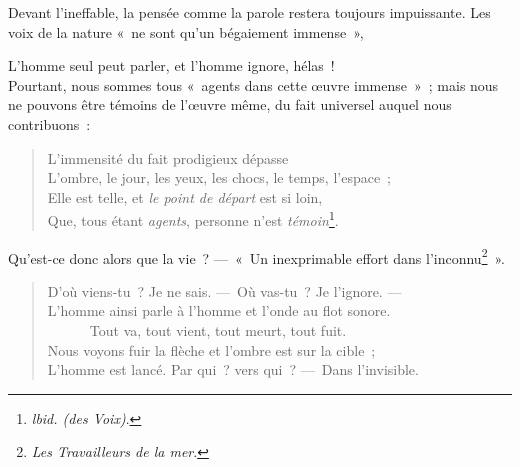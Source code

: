 \documentclass[french,twoside]{book} %
\begin{document}
\noindent Devant l’ineffable, la pensée comme la parole restera toujours impuissante. Les voix de la nature « ne sont qu’un bégaiement immense »,\par

L’homme seul peut parler, et l’homme ignore, hélas !\\

\noindent Pourtant, nous sommes tous « agents dans cette œuvre immense » ; mais nous ne pouvons être témoins de l’œuvre même, du fait universel auquel nous contribuons :\par


\begin{verse}
L’immensité du fait prodigieux dépasse\\
L’ombre, le jour, les yeux, les chocs, le temps, l’espace ;\\
Elle est telle, et \emph{le point de départ} est si loin,\\
Que, tous étant \emph{agents}, personne n’est \emph{témoin}\footnote{\emph{lbid. (des Voix)}.}.\\
\end{verse}

\noindent Qu’est-ce donc alors que la vie ? — « Un inexprimable effort dans l’inconnu\footnote{\emph{Les Travailleurs de la mer}.} ».\par


\begin{verse}
D’où viens-tu ? Je ne sais. — Où vas-tu ? Je l’ignore. —\\
L’homme ainsi parle à l’homme et l’onde au flot sonore.\\
      Tout va, tout vient, tout meurt, tout fuit.\\
Nous voyons fuir la flèche et l’ombre est sur la cible ;\\
L’homme est lancé. Par qui ? vers qui ? — Dans l’invisible.\\
\end{verse}
\end{document}
